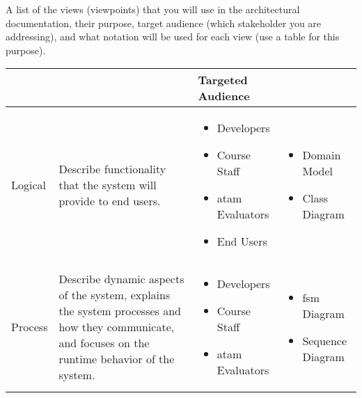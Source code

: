A list of the views (viewpoints) that you will use in the architectural
documentation, their purpose, target audience (which stakeholder you are
addressing), and what notation will be used for each view (use a table for this purpose).

\bgroup
	\def\arraystretch{2}
	\begin{table}[ht]
		\centering
		\small
		\begin{tabularx}{\textwidth}{p{2cm}Xp{4cm}p{4cm}}
			\toprule
				\thead{View} & \thead{Purpose} & \thead{Targeted \\Audience} & \thead{Notation} \\
			\midrule
				Logical & Describe functionality that the system will provide to end users. &
				\begin{minipage}[t]{\textwidth}
				  \begin{itemize}[noitemsep, leftmargin=15pt]
				    \item Developers
						\item Course Staff
						\item \gls{atam} Evaluators
						\item End Users
				  \end{itemize}
				\end{minipage}
				&
				\begin{minipage}[t]{\textwidth}
					\begin{itemize}[noitemsep, leftmargin=10pt]
						\item Domain Model
						\item Class Diagram
					\end{itemize}
				\end{minipage} \\

				Process & Describe dynamic aspects of the system, explains the system processes and how they communicate, and focuses on the runtime behavior of the system. &
				\begin{minipage}[t]{\textwidth}
					\begin{itemize}[noitemsep, leftmargin=15pt]
						\item Developers
						\item Course Staff
						\item \gls{atam} Evaluators
					\end{itemize}
				\end{minipage}
				&
				\begin{minipage}[t]{\textwidth}
					\begin{itemize}[noitemsep, leftmargin=10pt]
						\item \gls{fsm} Diagram
						\item Sequence Diagram
					\end{itemize}
				\end{minipage} \\


\end{tabularx}
\end{table}
